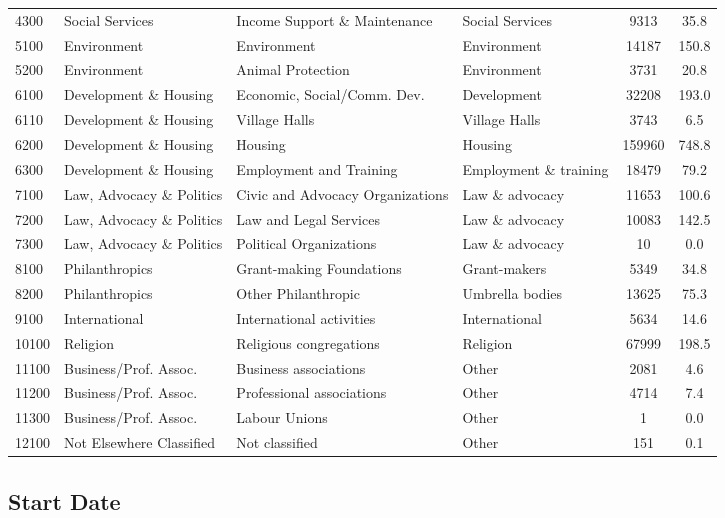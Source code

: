 \documentclass[12pt]{article}
\begin{document}
\begin{table}[!t]
\begin{tabular}{llllcc}
4300  & Social Services & Income Support \& Maintenance  & Social Services  & 9313 & 35.8 \\
5100  & Environment   & Environment  & Environment  & 14187  & 150.8   \\
5200  & Environment   & Animal Protection & Environment  & 3731 & 20.8 \\
6100  & Development \& Housing  & Economic, Social/Comm. Dev. & Development  & 32208  & 193.0   \\
6110  & Development \& Housing  & Village Halls   & Village Halls  & 3743 & 6.5  \\
6200  & Development \& Housing  & Housing  & Housing  & 159960 & 748.8   \\
6300  & Development \& Housing  & Employment and Training  & Employment \& training  & 18479  & 79.2 \\
7100  & Law, Advocacy \& Politics & Civic and Advocacy Organizations  & Law \& advocacy & 11653  & 100.6   \\
7200  & Law, Advocacy \& Politics & Law and Legal Services & Law \& advocacy & 10083  & 142.5   \\
7300  & Law, Advocacy \& Politics & Political Organizations  & Law \& advocacy & 10 & 0.0  \\
8100  & Philanthropics & Grant-making Foundations & Grant-makers   & 5349 & 34.8 \\
8200  & Philanthropics & Other Philanthropic  & Umbrella bodies  & 13625  & 75.3 \\
9100  & International & International activities & International  & 5634 & 14.6 \\
10100 & Religion & Religious congregations   & Religion   & 67999  & 198.5   \\
11100 & Business/Prof. Assoc.  & Business associations  & Other & 2081 & 4.6  \\
11200 & Business/Prof. Assoc.  & Professional associations  & Other & 4714 & 7.4  \\
11300 & Business/Prof. Assoc.  & Labour Unions   & Other & 1  & 0.0  \\
12100 & Not Elsewhere Classified & Not  classified & Other & 151  & 0.1 \\ \bottomrule
\end{tabular}
\end{table}

\subsection{Start Date}
\end{document}
